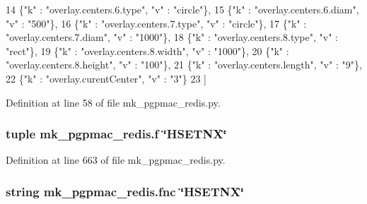 \begin{DoxyCode}
14     \{\textcolor{stringliteral}{"k"} : \textcolor{stringliteral}{"overlay.centers.6.type"},   \textcolor{stringliteral}{"v"} : \textcolor{stringliteral}{"circle"}\},
15     \{\textcolor{stringliteral}{"k"} : \textcolor{stringliteral}{"overlay.centers.6.diam"},   \textcolor{stringliteral}{"v"} : \textcolor{stringliteral}{"500"}\},
16     \{\textcolor{stringliteral}{"k"} : \textcolor{stringliteral}{"overlay.centers.7.type"},   \textcolor{stringliteral}{"v"} : \textcolor{stringliteral}{"circle"}\},
17     \{\textcolor{stringliteral}{"k"} : \textcolor{stringliteral}{"overlay.centers.7.diam"},   \textcolor{stringliteral}{"v"} : \textcolor{stringliteral}{"1000"}\},
18     \{\textcolor{stringliteral}{"k"} : \textcolor{stringliteral}{"overlay.centers.8.type"},   \textcolor{stringliteral}{"v"} : \textcolor{stringliteral}{"rect"}\},
19     \{\textcolor{stringliteral}{"k"} : \textcolor{stringliteral}{"overlay.centers.8.width"},  \textcolor{stringliteral}{"v"} : \textcolor{stringliteral}{"1000"}\},
20     \{\textcolor{stringliteral}{"k"} : \textcolor{stringliteral}{"overlay.centers.8.height"}, \textcolor{stringliteral}{"v"} : \textcolor{stringliteral}{"100"}\},
21     \{\textcolor{stringliteral}{"k"} : \textcolor{stringliteral}{"overlay.centers.length"},   \textcolor{stringliteral}{"v"} : \textcolor{stringliteral}{"9"}\},
22     \{\textcolor{stringliteral}{"k"} : \textcolor{stringliteral}{"overlay.curentCenter"},     \textcolor{stringliteral}{"v"} : \textcolor{stringliteral}{"3"}\}
23     ]
\end{DoxyCode}


Definition at line 58 of file mk\-\_\-pgpmac\-\_\-redis.\-py.

\hypertarget{namespacemk__pgpmac__redis_a057fe7457503e0de97edcf855591ed58}{
\subsubsection[{f}]{\setlength{\rightskip}{0pt plus 5cm}tuple mk\-\_\-pgpmac\-\_\-redis.\-f \char`\"{}H\-S\-E\-T\-N\-X\char`\"{}}}\label{namespacemk__pgpmac__redis_a057fe7457503e0de97edcf855591ed58}


Definition at line 663 of file mk\-\_\-pgpmac\-\_\-redis.\-py.

\hypertarget{namespacemk__pgpmac__redis_a654b54ba0758b8b84516938260851129}{
\subsubsection[{fnc}]{\setlength{\rightskip}{0pt plus 5cm}string mk\-\_\-pgpmac\-\_\-redis.\-fnc \char`\"{}H\-S\-E\-T\-N\-X\char`\"{}}}\label{namespacemk__pgpmac__redis_a654b54ba0758b8b84516938260851129}


